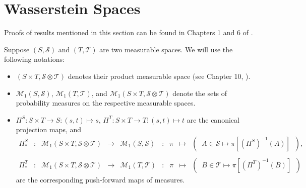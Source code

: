 

\section{Wasserstein Spaces}
\setcounter{theorem}{0}
\setcounter{equation}{0}

Proofs of results mentioned in this section can be found in Chapters 1 and 6 of \cite{Villani2009}.

\vskip 0.5cm
\noindent
Suppose $\left(S,\mathcal{S}\right)$ and $\left(T,\mathcal{T}\right)$ are two measurable spaces.
We will use the following notations:
\begin{itemize}
\item $\left(S \times T, \mathcal{S} \otimes \mathcal{T}\right)$ denotes their product measurable space (see Chapter 10, \cite{JacodProtter}).
\item $\mathcal{M}_{1}\!\left(S,\mathcal{S}\right)$, $\mathcal{M}_{1}\!\left(T,\mathcal{T}\right)$, and
	$\mathcal{M}_{1}\!\left(S \times T, \mathcal{S}\otimes\mathcal{T}\right)$
	denote the sets of probability measures on the respective measurable spaces.
\item $\Pi^{S} : S \times T \longrightarrow S : (s,t) \longmapsto s$,
	$\Pi^{T} : S \times T \longrightarrow T : (s,t) \longmapsto t$
	are the canonical projection maps, and
	\begin{equation*}
	\begin{array}{ccccccccc}
	\Pi^{S}_{*}
	&:
	&\mathcal{M}_{1}\!\left(S \times T, \mathcal{S}\otimes\mathcal{T}\right)
	&\longrightarrow
	&\mathcal{M}_{1}\!\left(S,\mathcal{S}\right)
	&:
	&\pi
	&\longmapsto
	&\left(\;\;A \in \mathcal{S} \longmapsto \pi\!\left[(\Pi^{S})^{-1}(A)\right]\;\;\right),
	\\ \\
	\Pi^{T}_{*}
	&:
	&\mathcal{M}_{1}\!\left(S \times T, \mathcal{S}\otimes\mathcal{T}\right)
	&\longrightarrow
	&\mathcal{M}_{1}\!\left(T,\mathcal{T}\right)
	&:
	&\pi
	&\longmapsto
	&\left(\;\;B \in \mathcal{T} \longmapsto \pi\!\left[(\Pi^{T})^{-1}(B)\right]\;\;\right)
	\end{array}
	\end{equation*}
	are the corresponding push-forward maps of measures.
\end{itemize}

